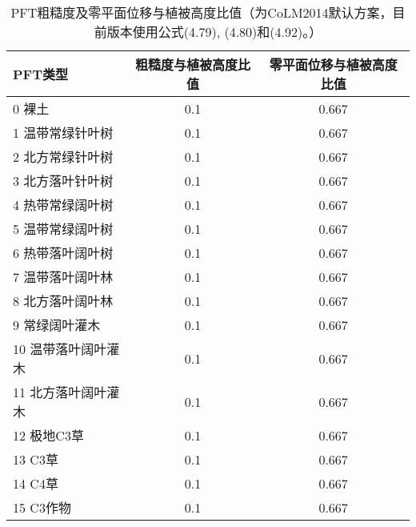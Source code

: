 \begin{table}[]
    \centering
    \caption{PFT粗糙度及零平面位移与植被高度比值（为CoLM2014默认方案，目前版本使用公式(4.79), (4.80)和(4.92)。）}
    \label{tab:PFT粗糙度及零平面位移与植被高度比值}
    \begin{tabular}{@{}lcc@{}}
    \toprule
    PFT类型       & 粗糙度与植被高度比值 & 零平面位移与植被高度比值 \\ \midrule
    0 裸土        & 0.1        & 0.667        \\
    1 温带常绿针叶树   & 0.1        & 0.667        \\
    2 北方常绿针叶树   & 0.1        & 0.667        \\
    3 北方落叶针叶树   & 0.1        & 0.667        \\
    4 热带常绿阔叶树   & 0.1        & 0.667        \\
    5 温带常绿阔叶树   & 0.1        & 0.667        \\
    6 热带落叶阔叶树   & 0.1        & 0.667        \\
    7 温带落叶阔叶林   & 0.1        & 0.667        \\
    8 北方落叶阔叶林   & 0.1        & 0.667        \\
    9 常绿阔叶灌木    & 0.1        & 0.667        \\
    10 温带落叶阔叶灌木 & 0.1        & 0.667        \\
    11 北方落叶阔叶灌木 & 0.1        & 0.667        \\
    12 极地C3草    & 0.1        & 0.667        \\
    13 C3草      & 0.1        & 0.667        \\
    14 C4草      & 0.1        & 0.667        \\
    15 C3作物     & 0.1        & 0.667        \\ \bottomrule
    \end{tabular}
\end{table}



